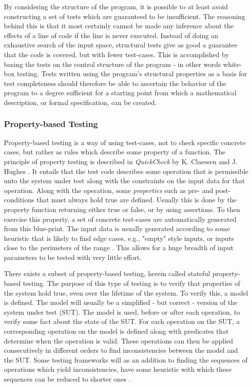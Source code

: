 By considering the structure of the program, it is possible to at least avoid constructing a set of tests which are guaranteed to be insufficient. The reasoning behind this is that it most certainly cannot be made any inference about the effects of a line of code if the line is never executed. Instead of doing an exhaustive search of the input space, structural tests give as good a guarantee that the code is covered, but with fewer test-cases. This is accomplished by basing the tests on the control structure of the program \cite{comparison} - in other words white-box testing. Tests written using the program's structural properties as a basis for test completeness should therefore be able to ascertain the behavior of the program to a degree sufficient for a starting point from which a mathematical description, or formal specification, can be created.

\subsubsection{Property-based Testing}\label{pbtesting}
Property-based testing is a way of using test-cases, not to check specific concrete cases, but rather as rules which describe some property of a function. The principle of property testing is described in \textit{QuickCheck} by K. Claessen and J. Hughes \cite{QUICKCHECK}. It entails that the test code describes some operation that is permissible unto the system under test along with the constraints on the input data for that operation. Along with the operation, some \textit{properties} such as pre- and post-conditions that must always hold true are defined. Usually this is done by the property function returning either true or false, or by using assertions. To then exercise this property, a set of concrete test-cases are automatically generated from this blue-print. The input data is usually generated according to some heuristic that is likely to find edge cases, e.g., "empty" style inputs, or inputs close to the perimeters of the range \cite{duregard_automating_2016}. This allows for a huge breadth of input parameters to be tested with very little effort.

There exists a subset of property-based testing, herein called stateful property-based testing. The purpose of this type of testing is to verify that properties of the system hold true, even over the lifetime of the system. To verify this, a model is defined. The model will usually be a simplified - but correct - version of the system under test (SUT). The model is used, before or after each operation, to verify some fact about the state of the SUT. For each operation on the SUT, a corresponding operation on the model is defined along with predicates that determine when the operation is valid. These operations can then be applied consecutively in different orders to find inconsistencies between the model and the SUT. Some testing frameworks will as an addition to finding the sequences of operations which yield inconsistencies, have some heuristic with which these sequences can be reduced to shorter ones \cite{QUICKCHECK}.

